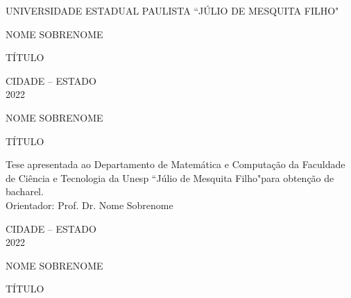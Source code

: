 \documentclass[12pt,nodisplayskipstretch]{article}
\newenvironment{natureza}{\hspace{59mm}\begin{minipage}[c]{95mm}\begin{justify}}{\end{justify}\end{minipage}}
\newcommand{\titulo}{\begin{center}\uppercase{Título}\end{center}}
\newcommand{\nome}{\begin{center}\uppercase{Nome Sobrenome}\end{center}}
\newcommand{\instituicao}{\begin{center}\uppercase{Universidade Estadual Paulista ``Júlio de Mesquita Filho"}\end{center}}
\begin{document}

\thispagestyle{empty}
\instituicao

\vspace{4cm}

\nome 

\vspace{5cm}


\titulo 


\vspace*{\fill}

\begin{center}
    \uppercase{Cidade -- Estado\\2022}
\end{center}


\newpage

\thispagestyle{empty}

\nome

\vspace{5cm}

\titulo

\vspace{5cm}

\begin{natureza}
\noindent Tese apresentada ao Departamento de Matemática e Computação da Faculdade de Ciência e Tecnologia da Unesp ``Júlio de Mesquita Filho"\;para obtenção de bacharel.\\
Orientador: Prof. Dr. Nome Sobrenome
\end{natureza}

\vspace*{\fill}

\begin{center}
\uppercase{Cidade -- Estado\\2022}
\end{center}


\newpage 
\thispagestyle{empty}

\nome

\vspace{2cm}

\titulo
\end{document}
